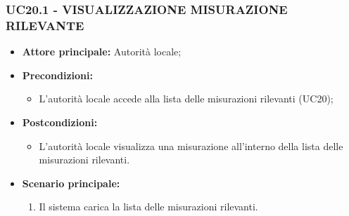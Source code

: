 \subsubsection{UC20.1 - VISUALIZZAZIONE MISURAZIONE RILEVANTE}
\begin{itemize}
    \item \textbf{Attore principale:} Autorità locale;
    \item \textbf{Precondizioni:}
        \begin{itemize}
                \item L'autorità locale accede alla lista delle misurazioni rilevanti (UC20);
        \end{itemize}
    \item \textbf{Postcondizioni:}
        \begin{itemize}
                \item L'autorità locale visualizza una misurazione all'interno della lista delle misurazioni rilevanti.
        \end{itemize}
    \item \textbf{Scenario principale:}
        \begin{enumerate}
                \item Il sistema carica la lista delle misurazioni rilevanti.
        \end{enumerate}
\end{itemize}
